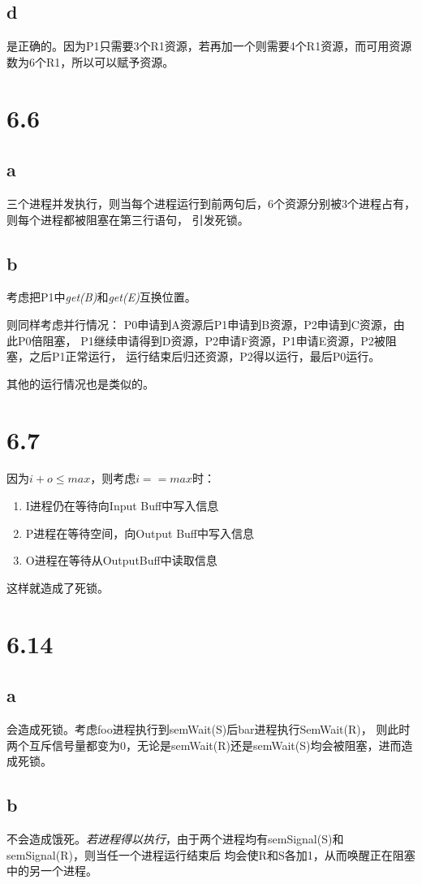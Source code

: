 \documentclass[UTF8]{ctexart}
\begin{document}
    \subsection{d}
    是正确的。因为P1只需要3个R1资源，若再加一个则需要4个R1资源，而可用资源数为6个R1，所以可以赋予资源。
    \section{6.6}
    \subsection{a}
    三个进程并发执行，则当每个进程运行到前两句后，6个资源分别被3个进程占有，则每个进程都被阻塞在第三行语句，
    引发死锁。
    \subsection{b}
    考虑把P1中\emph{get(B)}和\emph{get(E)}互换位置。\par
    则同样考虑并行情况：
    P0申请到A资源后P1申请到B资源，P2申请到C资源，由此P0倍阻塞，
    P1继续申请得到D资源，P2申请F资源，P1申请E资源，P2被阻塞，之后P1正常运行，
    运行结束后归还资源，P2得以运行，最后P0运行。

    其他的运行情况也是类似的。
    \section{6.7}
    因为$i+o\le max$，则考虑$i==max$时：
    \begin{enumerate}[1.]
        \item I进程仍在等待向Input Buff中写入信息
        \item P进程在等待空间，向Output Buff中写入信息
        \item O进程在等待从OutputBuff中读取信息
    \end{enumerate}
    这样就造成了死锁。

    \section{6.14}
    \subsection{a}
    会造成死锁。考虑foo进程执行到semWait(S)后bar进程执行SemWait(R)，
    则此时两个互斥信号量都变为0，无论是semWait(R)还是semWait(S)均会被阻塞，进而造成死锁。
    \subsection{b}
    不会造成饿死。\emph{若进程得以执行}，由于两个进程均有semSignal(S)和semSignal(R)，则当任一个进程运行结束后
    均会使R和S各加1，从而唤醒正在阻塞中的另一个进程。
\end{document}
